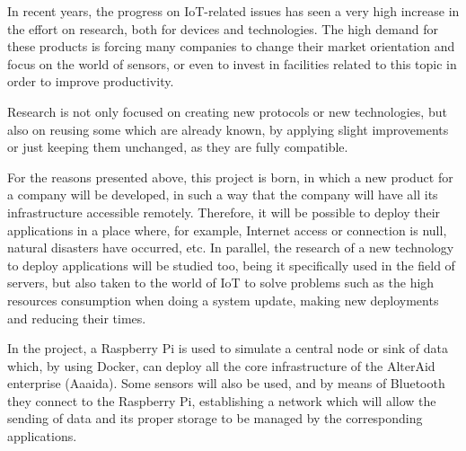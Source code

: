 \documentclass[spanish,final]{setup/eetac_tfc_pfc}
\begin{document}
\begin{overview}{11cm}
In recent years, the progress on IoT-related issues has seen a very high increase in the effort on research, both for devices and technologies. The high demand for these products is forcing many companies to change their market orientation and focus on the world of sensors, or even to invest in facilities related to this topic in order to improve productivity.
\newline 

Research is not only focused on creating new protocols or new technologies, but also on reusing some which are already known, by applying slight improvements or just keeping them unchanged, as they are fully compatible.
\newline 

For the reasons presented above, this project is born, in which a new product for a company will be developed, in such a way that the company will have all its infrastructure accessible remotely. Therefore, it will be possible to deploy their applications in a place where, for example, Internet access or connection is null, natural disasters have occurred, etc. In parallel, the research of a new technology to deploy applications will be studied too, being it specifically used in the field of servers, but also taken to the world of IoT to solve problems such as the high resources consumption when doing a system update, making new deployments and reducing their times.
\newline 

In the project, a Raspberry Pi is used to simulate a central node or sink of data which, by using Docker, can deploy all the core infrastructure of the AlterAid enterprise (Aaaida). Some sensors will also be used, and by means of Bluetooth they connect to the Raspberry Pi, establishing a network which will allow the sending of data and its proper storage to be managed by the corresponding applications.

\end{overview}


\end{document}
